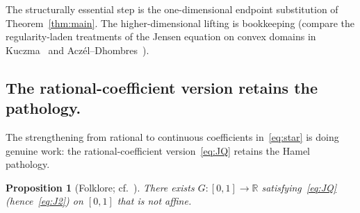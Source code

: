 \documentclass{article}
\theoremstyle{plain}
\newtheorem{proposition}[theorem]{Proposition}
\theoremstyle{definition}
\newcommand{\R}{\mathbb{R}}
\begin{document}
The structurally essential step is the one-dimensional endpoint substitution
of Theorem~\ref{thm:main}. The higher-dimensional lifting is
bookkeeping (compare the regularity-laden treatments of the Jensen
equation on convex domains in Kuczma~\cite[\S13.2]{Kuczma2009} and
Acz\'el--Dhombres~\cite{AczelDhombres1989}).

\subsection{The rational-coefficient version retains the pathology.}
\label{ssec:JQ-pathology}

The strengthening from rational to continuous coefficients
in~\eqref{eq:star} is doing genuine work: the rational-coefficient
version~\eqref{eq:JQ} retains the Hamel pathology.

\begin{proposition}[Folklore; cf.~{\cite[\S\S5.2 and~13.2]{Kuczma2009}}]%
\label{prop:JQ-pathology}
There exists $G\colon[0,1]\to\R$ satisfying~\eqref{eq:JQ}
(hence~\eqref{eq:J2}) on $[0,1]$ that is not affine.
\end{proposition}
\end{document}
